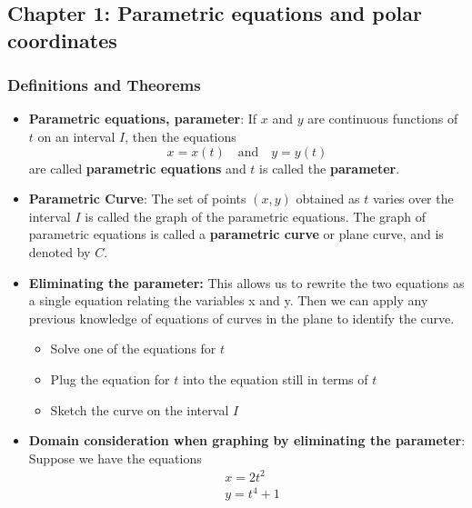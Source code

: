 \documentclass{report}
\begin{document}
\begin{itemize}
 
 




    \end{itemize}


    \pagebreak 

    \bigbreak \noindent 
    \subsection{Chapter 1: Parametric equations and polar coordinates}
    \subsubsection{Definitions and Theorems} 
    \begin{itemize}
        \item \textbf{Parametric equations, parameter}: 
            If \( x \) and \( y \) are continuous functions of \( t \) on an interval \( I \), then the equations
            \[ x = x(t) \quad \text{and} \quad y = y(t) \]
            are called \textbf{parametric equations} and \( t \) is called the \textbf{parameter}. 
        \item \textbf{Parametric Curve}: The set of points \( (x, y) \) obtained as \( t \) varies over the interval \( I \) is called the graph of the parametric equations. The graph of parametric equations is called a \textbf{parametric curve} or plane curve, and is denoted by \( C \).
        \item \textbf{Eliminating the parameter:} This allows us to rewrite the two equations as a single equation relating the variables x and y. Then we can apply any previous knowledge of equations of curves in the plane to identify the curve. 
            \begin{itemize}
                \item Solve one of the equations for $t$
                \item Plug the equation for $t$ into the equation still in terms of $t$
                \item Sketch the curve on the interval $I$
            \end{itemize}
        \item \textbf{Domain consideration when graphing by eliminating the parameter}: Suppose we have the equations 
            \begin{align*}
                &x = 2t^{2} \\
                &y = t^{4} + 1

\end{align*}
\end{itemize}
\end{document}
